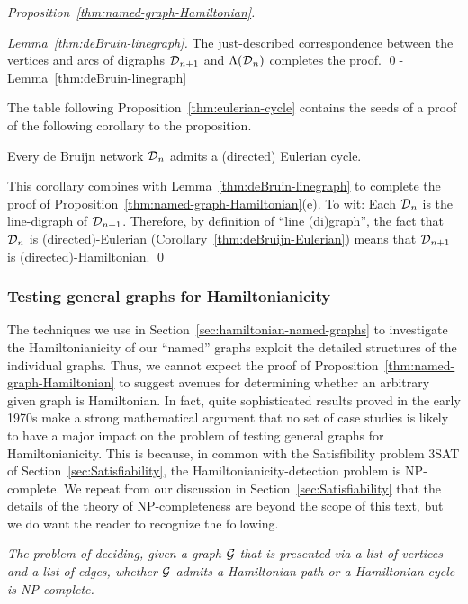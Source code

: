 \begin{proof}[Proposition~\ref{thm:named-graph-Hamiltonian}]
\begin{proof}[Lemma~\ref{thm:deBruin-linegraph}]
The just-described correspondence between the vertices and arcs of digraphs $\mbox{$\cal D$}_{n+1}$
and $\Lambda(\mbox{$\cal D$}_n)$ completes the proof.  \qed-Lemma~\ref{thm:deBruin-linegraph}
\end{proof}

\medskip

  

The table following Proposition~\ref{thm:eulerian-cycle} contains the seeds of a proof of
the following corollary to the proposition.

\begin{corol}
\label{thm:deBruijn-Eulerian}
Every de Bruijn network $\mbox{$\cal D$}_n$ admits a (directed) Eulerian cycle.
\end{corol}

This corollary combines with Lemma~\ref{thm:deBruin-linegraph} to complete the proof of 
Proposition~\ref{thm:named-graph-Hamiltonian}(e).  To wit:  Each $\mbox{$\cal D$}_n$ is the line-digraph of  $\mbox{$\cal D$}_{n+1}$. 
Therefore, by definition of  ``line (di)graph'', the fact that $\mbox{$\cal D$}_n$ is (directed)-Eulerian
(Corollary~\ref{thm:deBruijn-Eulerian}) means that $\mbox{$\cal D$}_{n+1}$ is (directed)-Hamiltonian.  \qed
\end{proof}


\subsubsection{Testing general graphs for Hamiltonianicity}
\label{sec:Hamiltonian-unweighted}

The techniques we use in Section~\ref{sec:hamiltonian-named-graphs} to investigate 
the Hamiltonianicity of our ``named'' graphs exploit the detailed structures of the individual 
graphs.  Thus, we cannot expect the proof of Proposition~\ref{thm:named-graph-Hamiltonian} 
to suggest avenues for determining whether an arbitrary given graph is Hamiltonian.  In
fact, quite sophisticated results proved in the early 1970s make a strong mathematical
argument that no set of case studies is likely to have a major impact on the problem of 
testing general graphs for Hamiltonianicity.  This is because, in common with the Satisfibility
problem {\sf 3SAT} of Section~\ref{sec:Satisfiability}, the Hamiltonianicity-detection problem is 
{\sf NP}-complete.  We repeat from our discussion in Section~\ref{sec:Satisfiability} that the
details of the theory of {\sf NP}-completeness are beyond the scope of
this text, but we do want the reader to recognize the following.
\begin{description}
\item
{\it The problem of deciding, given a graph $\mbox{$\cal G$}$ that is presented via a list of vertices and a 
list of edges, whether $\mbox{$\cal G$}$ admits a Hamiltonian path or a Hamiltonian cycle is {\sf NP}-complete.}
\end{description}


